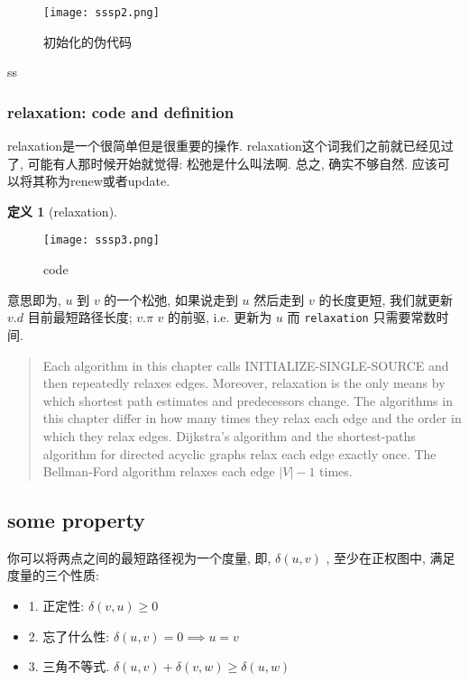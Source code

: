 \documentclass[a4paper, 10pt]{ctexart} %
\newtheorem{definition}{定义}
\begin{document}
\begin{figure}[H]
    \centering
    \texttt{[image: sssp2.png]}
    \caption{初始化的伪代码}
    \label{iss}
\end{figure}
ss

\subsubsection{relaxation: code and definition}

relaxation是一个很简单但是很重要的操作. relaxation这个词我们之前就已经见过了, 可能有人那时候开始就觉得: 
松弛是什么叫法啊. 总之, 确实不够自然. 
应该可以将其称为renew或者update. 

\begin{definition}[relaxation]
\end{definition}
\begin{figure}[H]
    \centering
    \texttt{[image: sssp3.png]}
    \caption{code}
    \label{relaxation}
\end{figure}

意思即为, $u$ 到 $v$ 的一个松弛, 如果说走到 $u$ 然后走到 $v$ 的长度更短, 我们就更新 $v.d$ 目前最短路径长度; $v.\pi$ $v$ 的前驱, i.e. 更新为 $u$
而 \verb|relaxation| 只需要常数时间. 

\begin{quotation}
Each algorithm in this chapter calls INITIALIZE-SINGLE-SOURCE and then repeatedly relaxes edges. Moreover, relaxation is the only means by which shortest
path estimates and predecessors change. The algorithms in this chapter differ in
how many times they relax each edge and the order in which they relax edges. Dijkstra's algorithm and the shortest-paths algorithm for directed acyclic graphs relax
each edge exactly once. The Bellman-Ford algorithm relaxes each edge $\left| V \right|  -1$
times.
\end{quotation}


\subsection{some property}

你可以将两点之间的最短路径视为一个度量, 即, $\delta \left(u ,v\right)$ , 至少在正权图中, 满足度量的三个性质: 

\begin{itemize}
    \item 1. 正定性: $\delta \left(v, u\right) \ge 0$
    \item 2. 忘了什么性: $\delta \left(u,v\right) = 0   \implies u = v$ 
    \item 3. 三角不等式. $\delta (u, v ) + \delta \left(v , w\right) \ge \delta (u ,w)$
\end{itemize}
\end{document}
